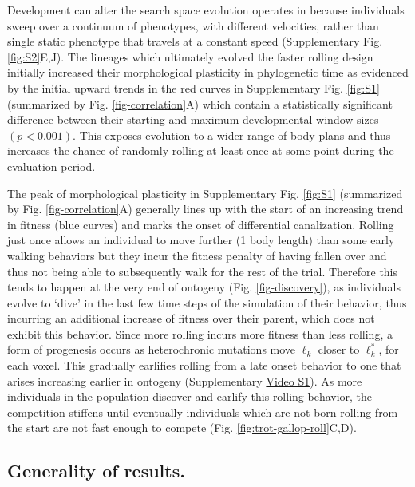 Development can alter the search space evolution operates in because individuals sweep over a continuum of phenotypes, with different velocities, rather than single static phenotype that travels at a constant speed (Supplementary Fig. \ref{fig:S2}E,J).%
The lineages which ultimately evolved the faster rolling design initially increased their morphological plasticity in phylogenetic time as evidenced by the initial upward trends in the red curves in Supplementary Fig. \ref{fig:S1}%
(summarized by Fig. \ref{fig-correlation}A) which contain a statistically significant difference between their starting and maximum developmental window sizes $(p<0.001)$.
This exposes evolution to a wider range of body plans and thus increases the chance of randomly rolling at least once at some point during the evaluation period.

The peak of morphological plasticity in  Supplementary Fig. \ref{fig:S1}%
(summarized by Fig. \ref{fig-correlation}A) generally lines up with the start of an increasing trend in fitness (blue curves) and marks the onset of differential canalization.
Rolling just once allows an individual to move further (1 body length) than some early walking behaviors but they incur the fitness penalty of having fallen over and thus not being able to subsequently walk for the rest of the trial. 
Therefore this tends to happen at the very end of ontogeny (Fig. \ref{fig-discovery}), as individuals evolve to `dive' in the last few time steps of the simulation of their behavior, thus incurring an additional increase of fitness over their parent, which does not exhibit this behavior.
Since more rolling incurs more fitness than less rolling, a form of progenesis occurs as heterochronic mutations move $\ell_k$ closer to $\ell_k^*$, for each voxel.
This gradually earlifies rolling from a late onset behavior to one that arises increasing earlier in ontogeny (Supplementary \href{https://youtu.be/Ee2sU-AZWC4}{\color{blue}Video S1}).
As more individuals in the population discover and earlify this rolling behavior, the competition stiffens until eventually individuals which are not born rolling from the start are not fast enough to compete (Fig. \ref{fig:trot-gallop-roll}C,D).


\subsection*{Generality of results.}


